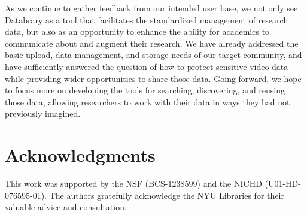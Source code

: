 \documentclass{sig-alternate-2013}
\begin{document}
As we continue to gather feedback from our intended user base, we not only see Databrary as a tool that facilitates the standardized management of research data, but also as an opportunity to enhance the ability for academics to communicate about and augment their research.
We have already addressed the basic upload, data management, and storage needs of our target community, and have sufficiently answered the question of how to protect sensitive video data while providing wider opportunities to share those data.
Going forward, we hope to focus more on developing the tools for searching, discovering, and reusing those data, allowing researchers to work with their data in ways they had not previously imagined.

\section*{Acknowledgments}

This work was supported by the NSF (BCS-1238599) and the NICHD (U01-HD-076595-01).
The authors gratefully acknowledge the NYU Libraries for their valuable advice and consultation.
\end{document}
